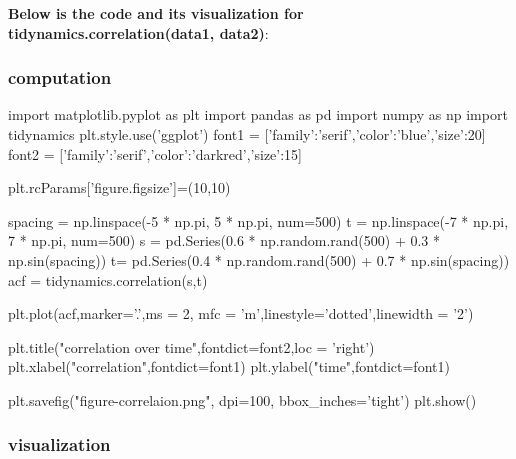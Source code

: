 \documentclass[12pt, a4paper, twoside]{report}
\begin{document}
 \textbf{Below is the code and its visualization for tidynamics.correlation(data1, data2)}:
\subsubsection{computation}

import matplotlib.pyplot as plt\newline
import pandas as pd\newline
import numpy as np\newline
import tidynamics\newline
plt.style.use('ggplot')\newline
font1 = ['family':'serif','color':'blue','size':20]\newline
font2 = ['family':'serif','color':'darkred','size':15]\newline

plt.rcParams['figure.figsize']=(10,10)\newline


spacing = np.linspace(-5 * np.pi, 5 * np.pi, num=500)\newline
t = np.linspace(-7 * np.pi, 7 * np.pi, num=500)\newline
s = pd.Series(0.6 * np.random.rand(500) + 0.3 * np.sin(spacing))\newline
t= pd.Series(0.4 * np.random.rand(500) + 0.7 * np.sin(spacing))\newline
acf = tidynamics.correlation(s,t)\newline



plt.plot(acf,marker='.',ms = 2, mfc = 'm',linestyle='dotted',linewidth = '2')\newline

plt.title("correlation over time",fontdict=font2,loc = 'right')\newline
plt.xlabel("correlation",fontdict=font1)\newline
plt.ylabel("time",fontdict=font1)\newline

plt.savefig("figure-correlaion.png", dpi=100, bbox_inches='tight')\newline
plt.show()\newline

\subsubsection{visualization}
\end{document}

